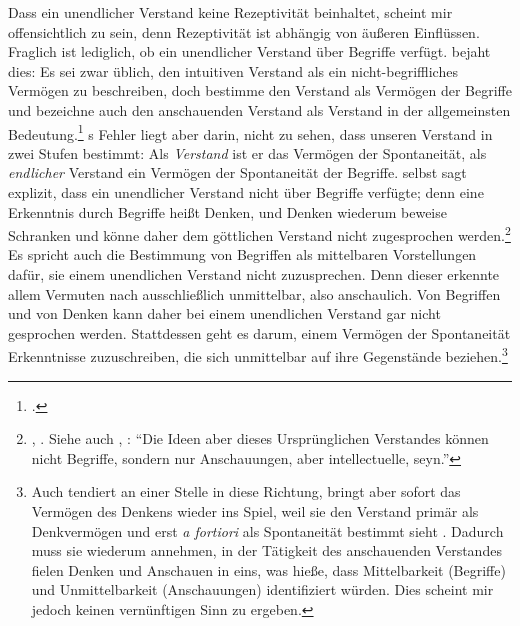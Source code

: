 Dass ein unendlicher Verstand keine Rezeptivität beinhaltet, scheint mir
offensichtlich zu sein, denn Rezeptivität ist abhängig von äußeren
Einflüssen. Fraglich ist lediglich, ob ein unendlicher Verstand über
Begriffe verfügt. 
bejaht dies: Es sei zwar üblich, den intuitiven Verstand als ein
nicht-begriffliches Vermögen zu beschreiben, doch bestimme 
den Verstand als Vermögen der Begriffe und bezeichne auch den anschauenden
Verstand als Verstand in der allgemeinsten
Bedeutung.\footnote{\cite[Vgl.][\pno~284\,f.]{Westphal:KantHegelandtheFateofenquotetheIntuitiveIntellect2000}.}
s
Fehler liegt aber darin, nicht zu sehen, dass  unseren
Verstand in zwei Stufen bestimmt: Als \emph{Verstand} ist er das Vermögen der
Spontaneität, als \emph{endlicher} Verstand ein Vermögen der Spontaneität der Begriffe.
 selbst sagt explizit, dass ein unendlicher Verstand nicht
über Begriffe verfügte; denn eine Erkenntnis durch Begriffe heißt Denken, und
Denken wiederum beweise Schranken und könne daher dem göttlichen Verstand nicht
zugesprochen werden.\footnote{\cite[Vgl.][B
71]{Kant:KritikderreinenVernunft2003}, \cite[][III:
72.10--16]{Kant:GesammelteWerke1900ff.}. Siehe auch
\cite[][]{Kant:Reflexionen1900ff.}, \cite[][XVIII:
434.22--24]{Kant:GesammelteWerke1900ff.}: \enquote{Die Ideen aber dieses
Ursprünglichen Verstandes können nicht Begriffe, sondern nur Anschauungen, aber
intellectuelle, seyn.}} Es spricht auch die Bestimmung von Begriffen als
mittelbaren Vorstellungen dafür, sie einem unendlichen Verstand nicht
zuzusprechen. Denn dieser erkennte allem Vermuten nach ausschließlich
unmittelbar, also anschaulich. Von Begriffen und von Denken kann daher bei einem
unendlichen Verstand gar nicht gesprochen werden. Stattdessen geht es darum, einem Vermögen der Spontaneität
Erkenntnisse zuzuschreiben, die sich unmittelbar auf ihre Gegenstände
beziehen.\footnote{Auch  tendiert an einer Stelle in
diese Richtung, bringt aber sofort das Vermögen des Denkens wieder ins Spiel,
weil sie den Verstand primär als Denkvermögen und erst \emph{a fortiori} als
Spontaneität bestimmt sieht
\parencite[vgl.][\pno~345\,f.]{Leech:MakingModalDistinctions2014}.
Dadurch muss sie wiederum annehmen, in der Tätigkeit des anschauenden Verstandes
fielen Denken und Anschauen in eins, was hieße, dass Mittelbarkeit (Begriffe)
und Unmittelbarkeit (Anschauungen) identifiziert würden. Dies
scheint mir jedoch keinen vernünftigen Sinn zu ergeben.}


